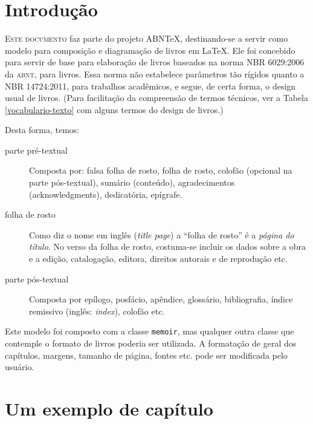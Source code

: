 \documentclass[a5paper]{memoir}
\begin{document}
\tableofcontents*
\cleardoublepage

\listoffigures*
\cleardoublepage

\listoftables*
\cleardoublepage

\mainmatter

\chapter*{Introdução}
\lettrine[nindent=0.35em,lhang=0.40,loversize=0.3]{E}{ste documento} faz parte do projeto ABN\TeX, destinando-se a servir como modelo para composição e diagramação de livros em \LaTeX. Ele foi concebido para servir de base para elaboração de livros baseados na norma NBR 6029:2006 da \textsc{abnt}, para livros. Essa norma não estabelece parâmetros tão rígidos quanto a NBR 14724:2011, para trabalhos acadêmicos, e segue, de certa forma, o design usual de livros. (Para facilitação da compreensão de termos técnicos, ver a Tabela \ref{vocabulario-texto} com alguns termos do design de livros.)

Desta forma, temos:

\begin{description}
\item[parte pré-textual] Composta por: falsa folha de rosto, folha de rosto, colofão (opcional na parte pós-textual), sumário (conteúdo), a\-gra\-de\-ci\-men\-tos (acknowledgments), dedicatória, epígrafe.
\item[folha de rosto] Como diz o nome em inglês (\textit{title page}) a “folha de rosto” é a \textit{página do título}. No verso da folha de rosto, costuma-se incluir os dados sobre a obra e a edição, catalogação, editora, direitos autorais e de reprodução etc.
\item [parte pós-textual] Composta por epílogo, posfácio, apêndice, glossário, bibliografia, índice remissivo (inglês: \textit{index}), colofão etc.

\end{description}

Este modelo foi composto com a classe \texttt{memoir}, mas qualquer outra classe que contemple o formato de livros poderia ser utilizada. A formatação de geral dos capítulos, margens, tamanho de página, fontes etc. pode ser modificada pelo usuário.

\chapter{Um exemplo de capítulo}
\lipsum[1-10]
\end{document}

